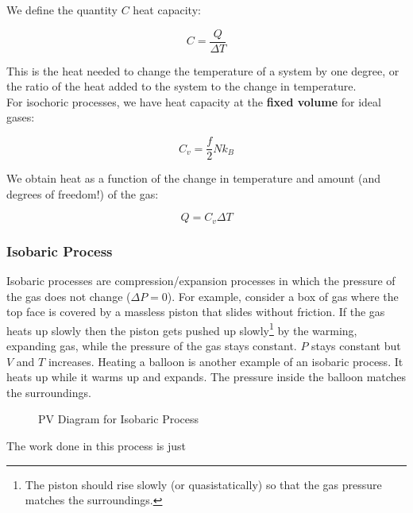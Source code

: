\documentclass[12pt, a4paper]{article}
\newcounter{exa}
\begin{document}
We define the quantity $C$ heat capacity:

$$C=\frac{Q}{\Delta T}$$

This is the heat needed to change the temperature of a system by one degree, or the ratio of the heat added to the system to the change in temperature. \\

For isochoric processes, we have heat capacity at the \textbf{fixed volume} for ideal gases:

$$C_v=\frac{f}{2}Nk_B$$

We obtain heat as a function of the change in temperature and amount (and degrees of freedom!) of the gas:

$$Q=C_v \Delta T$$

\subsubsection{Isobaric Process}

Isobaric processes are compression/expansion processes in which the pressure of the gas does not change ($\Delta P = 0$). For example, consider a box of gas where the top face is covered by a massless piston that slides without friction. If the gas heats up slowly then the piston gets pushed up slowly\footnote{The piston should rise slowly (or quasistatically) so that the gas pressure matches the surroundings.} by the warming, expanding gas, while the pressure of the gas stays constant. $P$ stays constant but $V$ and $T$ increases. Heating a balloon is another example of an isobaric process. It heats up while it warms up and expands. The pressure inside the balloon matches the surroundings.

\begin{figure}[H]
\centering
{}
\caption{PV Diagram for Isobaric Process}
\end{figure}

The work done in this process is just
\end{document}
